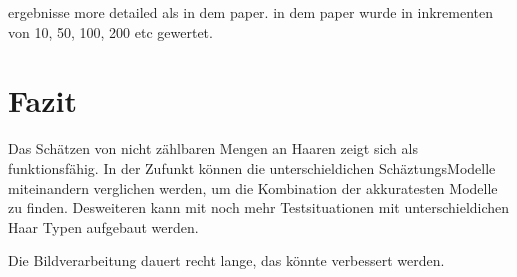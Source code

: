 \documentclass[german,a4paper, 12pt]{scrartcl}
\begin{document}
ergebnisse more detailed als in dem paper. in dem paper wurde in inkrementen von 10, 50, 100, 200 etc gewertet. 

\section{Fazit}
Das Schätzen von nicht zählbaren Mengen an Haaren zeigt sich als funktionsfähig. In der Zufunkt können die unterschieldichen SchäztungsModelle miteinandern verglichen werden, um die Kombination der akkuratesten Modelle zu finden. 
Desweiteren kann mit noch mehr Testsituationen mit unterschieldichen Haar Typen aufgebaut werden. 

Die Bildverarbeitung dauert recht lange, das könnte verbessert werden. 






\newpage
\appendix
\end{document}
